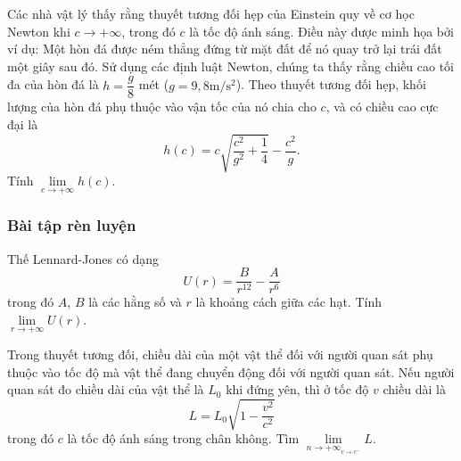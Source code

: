 \begin{vd}%
	Các nhà vật lý  thấy rằng thuyết tương đối hẹp của Einstein quy về cơ học Newton khi $c \rightarrow +\infty$, trong đó $c$ là tốc độ ánh sáng. Điều này được minh họa bởi ví dụ: Một hòn đá được ném thẳng đứng từ mặt đất để nó quay trở lại trái đất một giây sau đó. Sử dụng các định luật Newton, chúng ta thấy rằng chiều cao tối đa của hòn đá là $h=\dfrac{g}{8}$ mét ($g = 9{,}8 \mathrm{m/ s ^2}$). Theo thuyết tương đối hẹp, khối lượng của hòn đá phụ thuộc vào vận tốc của nó chia cho $c$, và có chiều cao cực đại là 
	\[
	h(c)=c \sqrt{\dfrac{c^2}{g^2}+\dfrac{1}{4}}- \dfrac{c^2}{g}.
	\]
	Tính $\lim\limits _{c \rightarrow +\infty} h(c)$.
\end{vd}

\subsubsection{Bài tập rèn luyện}
\begin{bt}%
	Thế Lennard-Jones có dạng $$U(r) = \dfrac{B}{r^{12}} - \dfrac{A}{r^6}$$ trong đó $A$, $B$ là các hằng số và $r$ là khoảng cách giữa các hạt. 
	Tính $\lim\limits _{r \rightarrow +\infty} U(r)$.
\end{bt}

\begin{bt}%
	Trong thuyết tương đối, chiều dài của một vật thể đối với người quan sát phụ thuộc vào tốc độ mà vật thể đang chuyển động đối với người quan sát. Nếu người quan sát đo chiều dài của vật thể là $L_0$ khi đứng yên, thì ở tốc độ $v$ chiều dài  là
	$$
	L=L_0 \sqrt{1-\frac{v^2}{c^2}}
	$$
	trong đó $c$ là tốc độ ánh sáng trong chân không. Tìm $\displaystyle \lim \limits_{n \to +\infty}_{v \rightarrow c^{-}} L$. 
\end{bt}

